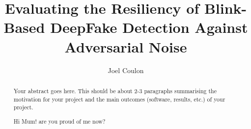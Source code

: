 \documentclass[a4paper,12pt]{report}
\author{Joel Coulon}
\title{Evaluating the Resiliency of Blink-Based DeepFake Detection Against Adversarial Noise}
\begin{document}


\pagestyle{plain}

\begin{abstract}
    Your abstract goes here. This should be about 2-3 paragraphs summarising the motivation for your project and the main outcomes (software, results, etc.) of your project. 
\end{abstract}

\renewcommand{\abstractname}{Acknowledgements}
\begin{abstract}
Hi Mum! {\tiny are you proud of me now?}
\end{abstract}

\tableofcontents
\listoffigures
{}
\listoftables
{}
\listoflistings
{}
\newpage











\appendix

\end{document}
